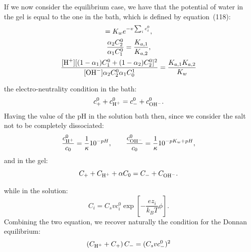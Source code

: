 \documentclass[12pt]{extarticle}
\begin{document}
If we now consider the equilibrium case, we have that the potential of water in the gel is equal to the one in the bath, which is defined by equation~(118):
\begin{gather}
[H^+][OH^-]=K_w e^{-v \sum_i c_i^0},\\
\frac{\alpha_2 C_2^0}{\alpha_1 C_1^0} =\frac{K_{a,1}}{K_{a,2}},\\
\frac{[\ce{H+}][(1-\alpha_1)C^0_1+(1-\alpha_2)C^0_2]^2}{[\ce{OH-}]\alpha_2 C^0_2\alpha_1 C_0^1} = \frac{K_{a,1} K_{a,2}}{K_w}
\end{gather}

the electro-neutrality condition in the bath:
\begin{equation}
c^0_+  + c^0_{\ce{H+}} = c^0_-+ c^0_{\ce{OH-}}. 
\end{equation}
Having the value of the pH in the solution bath then, since we consider the salt not to be completely dissociated:
\begin{equation}
\frac{c^0_{\ce{H+}}}{c_0} =  \frac{1}{\kappa} 10^{-pH}, \qquad \frac{c^0_{\ce{OH-}}}{c_0} = \frac{1}{\kappa} 10^{-pK_w+pH}, 
\end{equation}
and in the gel:
\begin{equation}
C_+  + C_{\ce{H+}} + \alpha C_0 = C_- + C_{\ce{OH-}}. 
\end{equation}

while in the solution:
\begin{equation}
C_i = C_s v c^0_i \exp\left[-\frac{ez_i}{k_BT}\phi\right].
\end{equation}
Combining the two equation, we recover naturally the condition for the Donnan equilibrium:
\begin{equation}
\left(C_{\ce{H+}}+C_+\right)C_- = (C_s v c^0_-)^2
\end{equation}


\end{document}
